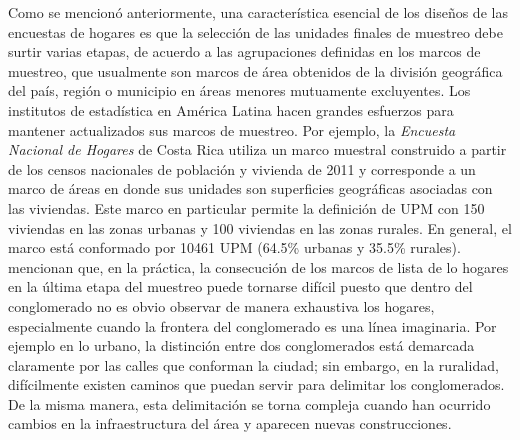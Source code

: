 \documentclass[12pt,spanish,]{book}
\begin{document}
Como se mencionó anteriormente, una característica esencial de los diseños de las encuestas de hogares es que la selección de las unidades finales de muestreo debe surtir varias etapas, de acuerdo a las agrupaciones definidas en los marcos de muestreo, que usualmente son marcos de área obtenidos de la división geográfica del país, región o municipio en áreas menores mutuamente excluyentes. Los institutos de estadística en América Latina hacen grandes esfuerzos para mantener actualizados sus marcos de muestreo. Por ejemplo, la \emph{Encuesta Nacional de Hogares} de Costa Rica utiliza un marco muestral construido a partir de los censos nacionales de población y vivienda de 2011 y corresponde a un marco de áreas en donde sus unidades son superficies geográficas asociadas con las viviendas. Este marco en particular permite la definición de UPM con 150 viviendas en las zonas urbanas y 100 viviendas en las zonas rurales. En general, el marco está conformado por 10461 UPM (64.5\% urbanas y 35.5\% rurales). \textcite{Gambino_Silva_2009} mencionan que, en la práctica, la consecución de los marcos de lista de lo hogares en la última etapa del muestreo puede tornarse difícil puesto que dentro del conglomerado no es obvio observar de manera exhaustiva los hogares, especialmente cuando la frontera del conglomerado es una línea imaginaria. Por ejemplo en lo urbano, la distinción entre dos conglomerados está demarcada claramente por las calles que conforman la ciudad; sin embargo, en la ruralidad, difícilmente existen caminos que puedan servir para delimitar los conglomerados. De la misma manera, esta delimitación se torna compleja cuando han ocurrido cambios en la infraestructura del área y aparecen nuevas construcciones.
\end{document}

